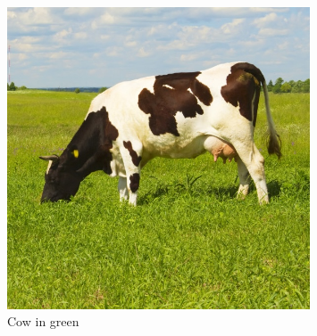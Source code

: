 \begin{frame}
\begin{minipage}{.3\textwidth}
\begin{figure}[H]
      \centering \includegraphics[width=0.8\textwidth]{figs/cow_grass.jpg}
      \caption{Cow in green}
    \end{figure}
  \end{minipage}
\end{frame}

